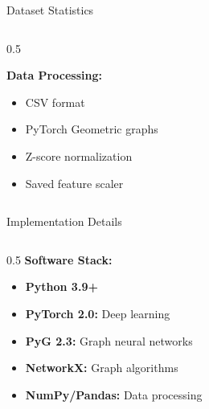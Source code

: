 \documentclass[aspectratio=169]{beamer}
\begin{document}
\begin{frame}{Dataset Statistics}
\begin{columns}
\begin{column}{0.5\textwidth}
            \vspace{0.2cm}
            
            \textbf{Data Processing:}
            \begin{itemize}
                \item CSV format
                \item PyTorch Geometric graphs
                \item Z-score normalization
                \item Saved feature scaler
            \end{itemize}
        \end{column}
    \end{columns}
\end{frame}

\begin{frame}{Implementation Details}
    \begin{columns}
        \begin{column}{0.5\textwidth}
            \textbf{Software Stack:}
            \begin{itemize}
                \item \textbf{Python 3.9+}
                \item \textbf{PyTorch 2.0:} Deep learning
                \item \textbf{PyG 2.3:} Graph neural networks
                \item \textbf{NetworkX:} Graph algorithms
                \item \textbf{NumPy/Pandas:} Data processing
            \end{itemize}
            
            \vspace{0.3cm}
            

\end{column}
\end{columns}
\end{frame}
\end{document}
